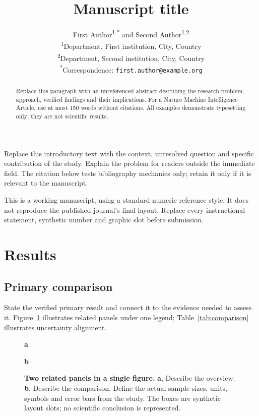 \documentclass[11pt]{article}
\title{Manuscript title}
\author{First Author\textsuperscript{1,*} and Second Author\textsuperscript{1,2}\\
  \small \textsuperscript{1}Department, First institution, City, Country\\
  \small \textsuperscript{2}Department, Second institution, City, Country\\
  \small \textsuperscript{*}Correspondence: \texttt{first.author@example.org}}
\date{}
\begin{document}
\maketitle
\begin{abstract}
Replace this paragraph with an unreferenced abstract describing the research
problem, approach, verified findings and their implications. For a Nature
Machine Intelligence Article, use at most 150 words without citations.
All examples demonstrate typesetting only; they are not scientific results.
\end{abstract}

Replace this introductory text with the context, unresolved question and
specific contribution of the study. Explain the problem for readers outside
the immediate field. The citation below tests bibliography mechanics only;
retain it only if it is relevant to the manuscript\cite{wilkinson2016fair}.

This is a working manuscript, using a standard numeric reference style.
It does not reproduce the published journal's final layout. Replace every
instructional statement, synthetic number and graphic slot before submission.

\section{Results}\label{sec:results}
\subsection{Primary comparison}
State the verified primary result and connect it to the evidence needed to
assess it. Figure~\ref{fig:comparison} illustrates related panels under one
legend; Table~\ref{tab:comparison} illustrates uncertainty alignment.

\begin{figure}[htbp]
\centering
\begin{minipage}[t]{0.47\linewidth}
\raggedright\textbf{a}\par\smallskip
{}
\end{minipage}\hfill
\begin{minipage}[t]{0.47\linewidth}
\raggedright\textbf{b}\par\smallskip
{}
\end{minipage}
\caption{\textbf{Two related panels in a single figure.} \textbf{a}, Describe
the overview. \textbf{b}, Describe the comparison. Define the actual sample
sizes, units, symbols and error bars from the study. The boxes are synthetic
layout slots; no scientific conclusion is represented.}
\label{fig:comparison}
\end{figure}
\end{document}
